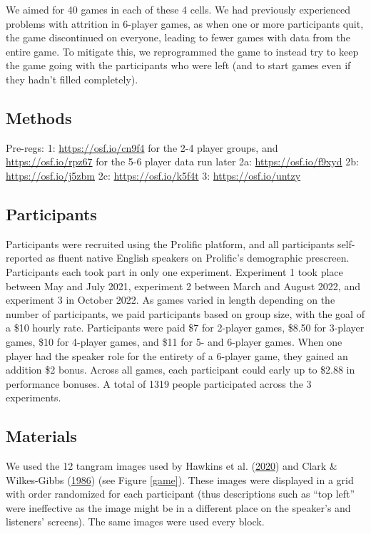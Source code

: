 \documentclass[
  english,
  a4paper,
]{article}
\begin{document}
We aimed for 40 games in each of these 4 cells. We had previously experienced problems with attrition in 6-player games, as when one or more participants quit, the game discontinued on everyone, leading to fewer games with data from the entire game. To mitigate this, we reprogrammed the game to instead try to keep the game going with the participants who were left (and to start games even if they hadn't filled completely).

\hypertarget{methods-1}{%
\subsection{Methods}\label{methods-1}}

Pre-regs:
1: \url{https://osf.io/cn9f4} for the 2-4 player groups, and \url{https://osf.io/rpz67} for the 5-6 player data run later
2a: \url{https://osf.io/f9xyd}
2b: \url{https://osf.io/j5zbm}
2c: \url{https://osf.io/k5f4t}
3: \url{https://osf.io/untzy}

\hypertarget{participants}{%
\subsection{Participants}\label{participants}}

Participants were recruited using the Prolific platform, and all participants self-reported as fluent native English speakers on Prolific's demographic prescreen. Participants each took part in only one experiment. Experiment 1 took place between May and July 2021, experiment 2 between March and August 2022, and experiment 3 in October 2022. As games varied in length depending on the number of participants, we paid participants based on group size, with the goal of a \$10 hourly rate. Participants were paid \$7 for 2-player games, \$8.50 for 3-player games, \$10 for 4-player games, and \$11 for 5- and 6-player games. When one player had the speaker role for the entirety of a 6-player game, they gained an addition \$2 bonus. Across all games, each participant could early up to \$2.88 in performance bonuses. A total of 1319 people participated across the 3 experiments.

\hypertarget{materials}{%
\subsection{Materials}\label{materials}}

We used the 12 tangram images used by Hawkins et al. (\protect\hyperlink{ref-hawkinsCharacterizingDynamicsLearning2020}{2020}) and Clark \& Wilkes-Gibbs (\protect\hyperlink{ref-clarkReferringCollaborativeProcess1986}{1986}) (see Figure \ref{game}). These images were displayed in a grid with order randomized for each participant (thus descriptions such as ``top left'' were ineffective as the image might be in a different place on the speaker's and listeners' screens). The same images were used every block.
\end{document}
